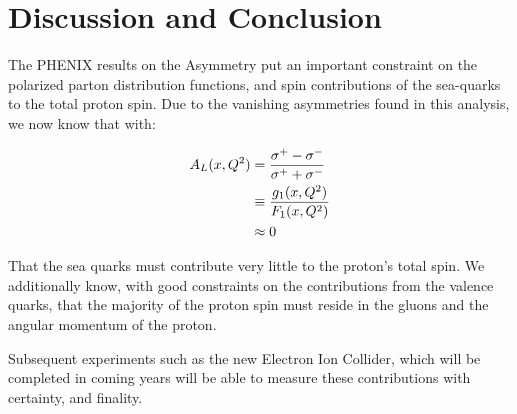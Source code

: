 \chapter{Discussion and Conclusion}

The PHENIX results on the Asymmetry put an important constraint on the polarized
parton distribution functions, and spin contributions of the sea-quarks to the
total proton spin. Due to the vanishing asymmetries found in this analysis, we
now know that with: 

\begin{align}
  A_L(x,Q^2) &= {{\sigma^+-\sigma^-}\over{\sigma^++\sigma^-}} \\
        &\equiv {{g_1(x,Q^2)}\over{F_1(x,Q^2)}} \\
        &\approx 0
\end{align}

That the sea quarks must contribute very little to the proton's total spin. We
additionally know, with good constraints on the contributions from the valence
quarks, that the majority of the proton spin must reside in the gluons and the
angular momentum of the proton.

Subsequent experiments such as the new Electron Ion Collider, which will be
completed in coming years will be able to measure these contributions with
certainty, and finality.
